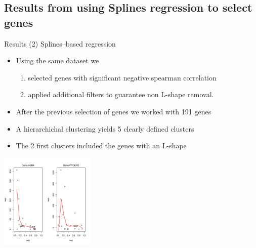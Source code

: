 \documentclass[handout]{beamer}
\begin{document}
\subsection{Results from using Splines regression to select genes}

\begin {frame}{Results (2) Splines--based regression}
\begin {itemize}
\item Using the same dataset we
\begin{enumerate}
  \item selected genes with significant negative spearman correlation
  \item applied additional filters to guarantee non L-shape removal.
\end{enumerate}
\item After the previous selection of genes we worked with 191 genes
\item A hierarchichal clustering yields 5 clearly defined clusters
\item The 2 first clusters included the genes with an L-shape
\end{itemize}
\begin{center}
\includegraphics[height=4.5cm]{./images/grafic_two_patterns.pdf}
\end{center}
\end{frame}
\end{document}

